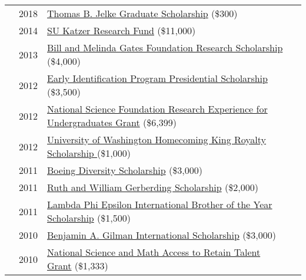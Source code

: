 \documentclass[12pt]{article}
\begin{document}
{{\begin{longtable}{Rp{1.0in}p{0.25in}p{4.75in}}
& \footnotesize{2018} & \href{https://www.afa1976.org/foundation}{{Thomas B. Jelke Graduate Scholarship}} (\$300) \\

& \footnotesize{2014} & \href{https://youtu.be/kFmO44rs3-c}{{SU Katzer Research Fund}} (\$11,000) \\

& \footnotesize{2013} & \href{https://expo.uw.edu/public/offering/271}{{Bill and Melinda Gates Foundation Research Scholarship}} (\$4,000) \\

& \footnotesize{2012} & \href{https://depts.washington.edu/eip/}{{Early Identification Program Presidential Scholarship}} (\$3,500) \\

& \footnotesize{2012} & \href{https://www.nsf.gov/crssprgm/reu/}{{National Science Foundation Research Experience for Undergraduates Grant}} (\$6,399) \\

& \footnotesize{2012} & \href{https://www.washington.edu/uaa/2013/06/28/oh-the-places-theyll-go-new-grads-and-their-plans/bryan-dosono/}{{University of Washington Homecoming King Royalty Scholarship }}(\$1,000) \\

& \footnotesize{2011} & \href{https://ischool.uw.edu/news/2016/12/bryan-dosono-informatics-student-speaks-boeing-scholarship-breakfast}{{Boeing Diversity Scholarship}} (\$3,000) \\

& \footnotesize{2011} & \href{https://www.washington.edu/omad/2011/05/17/assunta-ng-student-scholars-honored-at-41st-annual-eop-celebration/}{{Ruth and William Gerberding Scholarship}} (\$2,000) \\

& \footnotesize{2011} & \href{http://lambdaphiepsilon.com/resources/\#academicachievement}{{Lambda Phi Epsilon International Brother of the Year Scholarship}} (\$1,500) \\

& \footnotesize{2010} & \href{https://depts.washington.edu/uwhonors/news/brief/?id=61}{{Benjamin A. Gilman International Scholarship}} (\$3,000) \\

& \footnotesize{2010} & \href{https://www2.ed.gov/programs/smart/index.html}{{National Science and Math Access to Retain Talent Grant}} (\$1,333) \\


\end{longtable}}}
\end{document}
